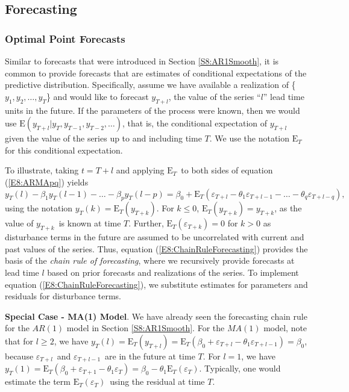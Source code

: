 \subsection{Forecasting}

\subsubsection*{Optimal Point Forecasts}

Similar to forecasts that were introduced in Section
\ref{S8:AR1Smooth}, it is common to provide forecasts that are
estimates of conditional expectations of the predictive
distribution. Specifically, assume we have available a realization
of \{$y_1, y_2, \ldots, y_T$\} and would like to forecast $y_{T+l}$,
the value of the series ``$l$'' lead time units in the future. If
the parameters of the process were known, then we would use
$\mathrm{E}(y_{T+l}|y_T,y_{T-1},y_{T-2},\ldots)$, that is, the
conditional expectation of $y_{T+l}$ given the value of the series
up to and including time $T$. We use the notation $\mathrm{E}_T$ for
this conditional expectation.

To illustrate, taking $t=T+l$ and applying $\mathrm{E}_T$\ to both
sides of equation (\ref{E8:ARMApq}) yields
\begin{equation}\label{E8:ChainRuleForecasting}
y_T(l) - \beta_1 y_T(l-1) - \ldots - \beta_p y_T(l-p) = \beta_0 +
\mathrm{E}_T\left( \varepsilon_{T+l} - \theta_1 \varepsilon_{T+l-1}
- \ldots - \theta _q \varepsilon_{T+l-q}\right) ,
\end{equation}
using the notation $y_T(k) = \mathrm{E}_T\left( y_{T+k}\right) $.
For $k \leq 0$, $\mathrm{E}_T\left( y_{T+k}\right) =y_{T+k}$, as the
value of $y_{T+k}$\ is known at time $T$. Further,
$\mathrm{E}_T\left( \varepsilon_{T+k}\right) =0$ for $k>0$ as
disturbance terms in the future are assumed to be uncorrelated with
current and past values of the series. Thus, equation
(\ref{E8:ChainRuleForecasting}) provides the basis of the
\emph{chain rule of forecasting}, where we recursively provide
forecasts at lead time $l$ based on prior forecasts and realizations
of the series. To implement equation
(\ref{E8:ChainRuleForecasting}), we substitute estimates for
parameters and residuals for disturbance terms.

\textbf{Special Case - MA(1) Model}. We have already seen the
forecasting chain rule for the $AR(1)$ model in Section
\ref{S8:AR1Smooth}. For the $MA(1)$ model, note that for $l\geq 2$,
we have $y_T(l)=\mathrm{E}_T\left( y_{T+l}\right)
=\mathrm{E}_T\left(
\beta_0+\varepsilon_{T+l}-\theta_1\varepsilon_{T+l-1}\right)
=\beta_0$, because $\varepsilon_{T+l}$\ and $\varepsilon _{T+l-1}$\
are in the future at time $T$. For $l=1$, we have $y_T(1)=
\mathrm{E}_T\left( \beta_0+\varepsilon_{T+1}-\theta
_1\varepsilon_T\right) =\beta_0-\theta_1\mathrm{E}_T\left(
\varepsilon_T\right) $. Typically, one would estimate the term
$\mathrm{E}_T\left( \varepsilon_T\right) $\ using the residual at
time $T$.


